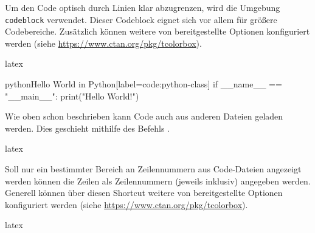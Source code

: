 Um den Code optisch durch Linien klar abzugrenzen, wird die Umgebung \texttt{codeblock} verwendet. Dieser Codeblock eignet sich vor allem für größere Codebereiche. Zusätzlich können weitere von \texttt{\NewTCBInputListing} bereitgestellte Optionen konfiguriert werden (siehe \url{https://www.ctan.org/pkg/tcolorbox}).

\begin{showcode}{latex}
    \begin{codeblock}{python}{Hello World in Python}[label={code:python-class}]
        if __name__ == "__main__":
            print("Hello World!")
    \end{codeblock}
\end{showcode}

Wie oben schon beschrieben kann Code auch aus anderen Dateien geladen werden. Dies geschieht mithilfe des Befehls \texttt{}.

\begin{showcode}{latex}
\end{showcode}

Soll nur ein bestimmter Bereich an Zeilennummern aus Code-Dateien angezeigt werden können die Zeilen als Zeilennummern (jeweils inklusiv) angegeben werden. Generell können über diesen Shortcut weitere von \texttt{\NewTCBInputListing} bereitgestellte Optionen konfiguriert werden (siehe \url{https://www.ctan.org/pkg/tcolorbox}).

\begin{showcode}{latex}
\end{showcode}